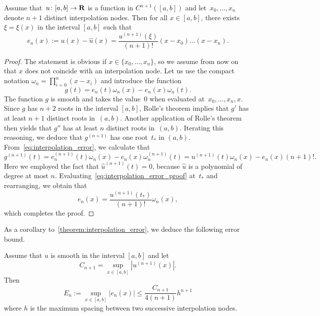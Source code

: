 \begin{theorem}
    \label{theorem:interpolation_error}
    Assume that~$u\colon [a, b] \to \mathbf R$ is a function in $C^{n+1}([a, b])$ and let~$x_0, \dotsc, x_n$ denote $n+1$ distinct interpolation nodes.
    Then for all $x \in [a, b]$,
    there exists~$\xi = \xi(x)$ in the interval $[a, b]$ such that
    \[
        e_n(x) := u(x) - \widehat u(x) = \frac{u^{(n+1)}(\xi)}{(n+1)!} (x-x_0) \dotsc (x - x_n).
    \]
\end{theorem}
\begin{proof}
    The statement is obvious if $x \in \{x_0, \dotsc, x_n\}$,
    so we assume from now on that $x$ does not coincide with an interpolation node.
    Let us use the compact notation $\omega_n = \prod_{i=0}^n (x - x_i)$ and introduce the function
    \begin{equation}
        \label{eq:interpolation_error}
        g(t) = e_n(t) \omega_n(x) - e_n(x) \omega_n(t).
    \end{equation}
    The function $g$ is smooth and takes the value~0 when evaluated at~$x_0, \dotsc, x_n, x$.
    Since $g$ has $n+2$ roots in the interval $[a, b]$,
    Rolle's theorem implies that $g'$ has at least $n+1$ distinct roots in~$(a, b)$.
    Another application of Rolle's theorem then yields that $g''$ has at least $n$ distinct roots in~$(a, b)$.
    Iterating this reasoning, we deduce that $g^{(n+1)}$ has one root~$t_*$ in $(a, b)$.
    From~\eqref{eq:interpolation_error},
    we calculate that
    \begin{equation}
        \label{eq:interpolation_error_proof}
        g^{(n+1)}(t) = e_n^{(n+1)}(t) \omega_n(x) - e_n(x) \omega_n^{(n+1)}(t)
        = u^{(n+1)}(t) \omega_n(x) - e_n(x) (n+1)!.
    \end{equation}
    Here we employed the fact that $\widehat u^{(n+1)}(t) = 0$,
    because $\widehat u$ is a polynomial of degree at most $n$.
    Evaluating~\eqref{eq:interpolation_error_proof} at~$t_*$ and rearranging,
    we obtain that
    \[
        e_n(x) = \frac{u^{(n+1)}(t_*)}{(n+1)!} \omega_n(x),
    \]
    which completes the proof.
\end{proof}
As a corollary to~\cref{theorem:interpolation_error},
we deduce the following error bound.
\begin{corollary}
    \label{corollary:interpolation_error}
    Assume that $u$ is smooth in the interval $[a, b]$ and let
    \[
        C_{n+1} =
        \sup_{x \in [a, b]} \left\lvert u^{(n+1)}(x) \right\rvert.
    \]
    Then
    \begin{equation}
        \label{eq:upper_bound_interp_error}
        E_n := \sup_{x \in [a, b]} \bigl\lvert e_n(x) \bigr\rvert \leq \frac{C_{n+1}}{4(n+1)} h^{n+1}
    \end{equation}
    where $h$ is the maximum spacing between two successive interpolation nodes.
\end{corollary}

